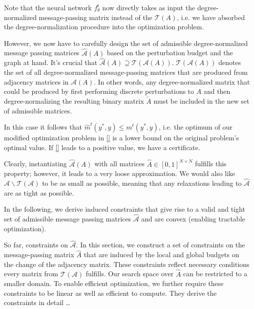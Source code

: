 \documentclass[a4paper,preprint]{sig-alternate}
\begin{document}
Note that the neural network $f_{\theta}^t$ now directly takes as input the degree-normalized message-passing matrix instead
of the $\mathcal{T}(A)$, i.e. we have absorbed the degree-normalization procedure into the optimization problem.\newline

However, we now have to carefully design the set of admissible degree-normalized message passing matrices $\mathcal{\hat{A}}(A)$ based
on the perturbation budget and the graph at hand. It's crucial that $\mathcal{\hat{A}}(A) \supseteq \mathcal{T}(\mathcal{A}(A))$.
$\mathcal{T}(\mathcal{A}(A))$ denotes the set of all degree-normalized message-passing matrices that are produced from adjacency matrices
in $\mathcal{A}(A)$. In other words, any degree-normalized matrix that could be produced by first performing discrete perturbations to $A$
and then degree-normalizing the resulting binary matrix $\tilde{A}$ must be included in the new set of admissible matrices.\newline

In this case it follows that $\hat{m}^t (y^{\ast}, y) \leq m^t (y^{\ast}, y)$, i.e. the optimum of our modified optimization problem in
\ref{} is a lower bound on the original problem's optimal value. If \ref{} leads to a positive value, we have a certificate.

Clearly, instantiating $\mathcal{\hat{A}}(A)$ with all matrices $\hat{A} \in [0, 1]^{N \times N}$ fulfills this property; however, it leads
to a very loose approximation. We would also like $\mathcal{\hat{A}} \backslash \mathcal{T}(\mathcal{A})$ to be as small as possible, meaning
that any relaxations leading to $\mathcal{\hat{A}}$ are as tight as possible.

In the following, we derive induced constraints that give rise to a valid and tight set of admissible message passing matrices $\mathcal{\hat{A}}$
and are convex (enabling tractable optimization).

So far, constraints on $\mathcal{\hat{A}}$. In this section, we construct a set of constraints on the message-passing matrix $\hat{A}$ that are
induced by the local and global budgets on the change of the adjacency matrix. These constraints reflect necessary conditions every matrix from
$\mathcal{T}(\mathcal{A})$ fulfills. Our search space over $\hat{A}$ can be restricted to a smaller domain. To enable efficient optimization,
we further require these constraints to be linear as well as efficient to compute. They derive the constraints in detail \dots\newline
\end{document}
